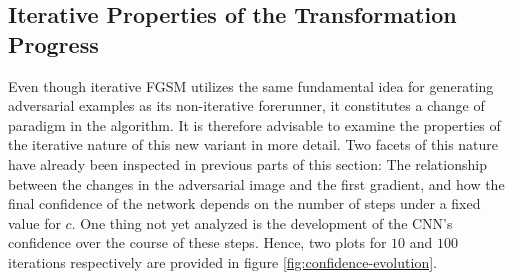 \documentclass[11pt, a4paper]{article}
\begin{document}
\subsection{Iterative Properties of the Transformation Progress}
\label{subsec:iterative-properties}
Even though iterative FGSM utilizes the same fundamental idea for generating adversarial examples as its non-iterative forerunner, it constitutes a change of paradigm in the algorithm. It is therefore advisable to examine the properties of the iterative nature of this new variant in more detail. Two facets of this nature have already been inspected in previous parts of this section: The relationship between the changes in the adversarial image and the first gradient, and how the final confidence of the network depends on the number of steps under a fixed value for $c$. One thing not yet analyzed is the development of the CNN's confidence over the course of these steps. Hence, two plots for $10$ and $100$ iterations respectively are provided in figure \ref{fig:confidence-evolution}.
\end{document}
